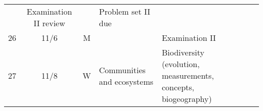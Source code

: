 \documentclass[]{article}
\begin{document}
\begin{longtable}[]{@{}cccllll@{}}
\begin{minipage}[t]{0.10\columnwidth}
\strut
\end{minipage} & \begin{minipage}[t]{0.11\columnwidth}\raggedright\strut
Examination II review\strut
\end{minipage} & \begin{minipage}[t]{0.11\columnwidth}\raggedright\strut
\strut
\end{minipage} & \begin{minipage}[t]{0.16\columnwidth}\raggedright\strut
Problem set II due\strut
\end{minipage}\tabularnewline
\begin{minipage}[t]{0.12\columnwidth}\centering\strut
26\strut
\end{minipage} & \begin{minipage}[t]{0.08\columnwidth}\centering\strut
11/6\strut
\end{minipage} & \begin{minipage}[t]{0.07\columnwidth}\centering\strut
M\strut
\end{minipage} & \begin{minipage}[t]{0.10\columnwidth}\raggedright\strut
\strut
\end{minipage} & \begin{minipage}[t]{0.11\columnwidth}\raggedright\strut
Examination II\strut
\end{minipage} & \begin{minipage}[t]{0.11\columnwidth}\raggedright\strut
\strut
\end{minipage} & \begin{minipage}[t]{0.16\columnwidth}\raggedright\strut
\strut
\end{minipage}\tabularnewline
\begin{minipage}[t]{0.12\columnwidth}\centering\strut
27\strut
\end{minipage} & \begin{minipage}[t]{0.08\columnwidth}\centering\strut
11/8\strut
\end{minipage} & \begin{minipage}[t]{0.07\columnwidth}\centering\strut
W\strut
\end{minipage} & \begin{minipage}[t]{0.10\columnwidth}\raggedright\strut
Communities and ecosystems\strut
\end{minipage} & \begin{minipage}[t]{0.11\columnwidth}\raggedright\strut
Biodiversity (evolution, measurements, concepts, biogeography)\strut
\end{minipage} & \begin{minipage}[t]{0.11\columnwidth}\raggedright\strut

\end{minipage}
\end{longtable}
\end{document}
